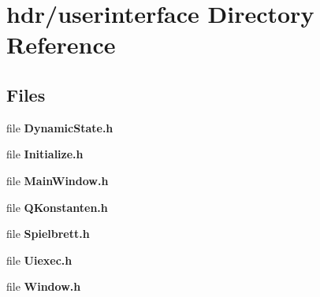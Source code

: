 \section{hdr/userinterface Directory Reference}
\label{dir_5cd1f6435bf62c6a6fa20b8fa16990bc}
\subsection*{Files}
\begin{DoxyCompactItemize}
\item 
file {\bfseries Dynamic\-State.\-h}
\item 
file {\bfseries Initialize.\-h}
\item 
file {\bfseries Main\-Window.\-h}
\item 
file {\bfseries Q\-Konstanten.\-h}
\item 
file {\bfseries Spielbrett.\-h}
\item 
file {\bfseries Uiexec.\-h}
\item 
file {\bfseries Window.\-h}
\end{DoxyCompactItemize}
